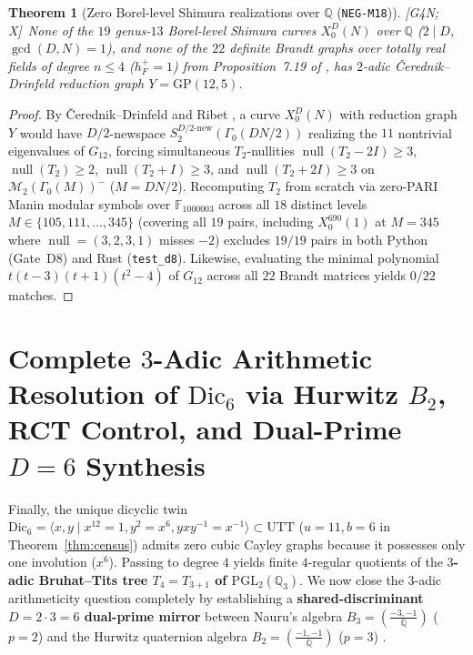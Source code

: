 \documentclass[11pt]{amsart}
\numberwithin{equation}{section}
\theoremstyle{plain}
\newtheorem{theorem}{Theorem}[section]
\theoremstyle{definition}\newtheorem{definition}[theorem]{Definition}
\theoremstyle{remark}\newtheorem{remark}[theorem]{Remark}
\newcommand{\Q}{\mathbb{Q}}
\newcommand{\F}{\mathbb{F}}
\newcommand{\PGL}{\mathrm{PGL}}
\newcommand{\UTT}{\mathrm{UTT}}
\newcommand{\GP}{\mathrm{GP}}
\newcommand{\ctag}[1]{\textup{\textsf{\scriptsize[#1]}}}
\begin{document}
\begin{theorem}[Zero Borel-level Shimura realizations over $\Q$ (\texttt{NEG-M18})]\label{thm:noborel}
\ctag{G4N; X}\ None of the $19$ genus-$13$ Borel-level Shimura curves $X_0^D(N)$ over $\Q$ ($2\mid D$, $\gcd(D,N)=1$), and none of the $22$ definite Brandt graphs over totally real fields of degree $n\le 4$ ($h_F^+=1$) from Proposition~7.19 of \cite{ergentics2026pc}, has $2$-adic \v{C}erednik--Drinfeld reduction graph $Y=\GP(12,5)$.
\end{theorem}
\begin{proof}
By \v{C}erednik--Drinfeld and Ribet \cite{cerednik1976,drinfeld1976,ribet1990}, a curve $X_0^D(N)$ with reduction graph $Y$ would have $D/2$-newspace $S_2^{D/2\text{-new}}(\Gamma_0(DN/2))$ realizing the $11$ nontrivial eigenvalues of $G_{12}$, forcing simultaneous $T_2$-nullities $\operatorname{null}(T_2-2I)\ge 3$, $\operatorname{null}(T_2)\ge 2$, $\operatorname{null}(T_2+I)\ge 3$, and $\operatorname{null}(T_2+2I)\ge 3$ on $\mathcal{M}_2(\Gamma_0(M))^-$ ($M=DN/2$). Recomputing $T_2$ from scratch via zero-PARI Manin modular symbols over $\F_{1000003}$ across all $18$ distinct levels $M\in\{105,111,\dots,345\}$ (covering all $19$ pairs, including $X_0^{690}(1)$ at $M=345$ where $\operatorname{null}=(3,2,3,1)$ misses $-2$) excludes $19/19$ pairs in both Python (Gate~D8) and Rust (\texttt{test\_d8}). Likewise, evaluating the minimal polynomial $t(t-3)(t+1)(t^2-4)$ of $G_{12}$ across all $22$ Brandt matrices yields $0/22$ matches.
\end{proof}

\section{Complete \texorpdfstring{$3$}{3}-Adic Arithmetic Resolution of \texorpdfstring{$\mathrm{Dic}_6$}{Dic6} via Hurwitz \texorpdfstring{$B_2$}{B2}, RCT Control, and Dual-Prime \texorpdfstring{$D{=}6$}{D=6} Synthesis}\label{sec:3adic}
Finally, the unique dicyclic twin $\mathrm{Dic}_6 = \langle x, y \mid x^{12}=1, y^2=x^6, yxy^{-1}=x^{-1}\rangle \subset \UTT$ ($u=11, b=6$ in Theorem~\ref{thm:census}) admits zero cubic Cayley graphs because it possesses only one involution ($x^6$). Passing to degree $4$ yields finite $4$-regular quotients of the \textbf{$3$-adic Bruhat--Tits tree $T_4 = T_{3+1}$ of $\PGL_2(\Q_3)$}. We now close the $3$-adic arithmeticity question completely by establishing a \textbf{shared-discriminant $D=2\cdot 3=6$ dual-prime mirror} between Nauru's algebra $B_3=(\frac{-3,-1}{\Q})$ ($p=2$) and the Hurwitz quaternion algebra $B_2=(\frac{-1,-1}{\Q})$ ($p=3$) \cite{vigneras1980,voight2021}.
\end{document}
